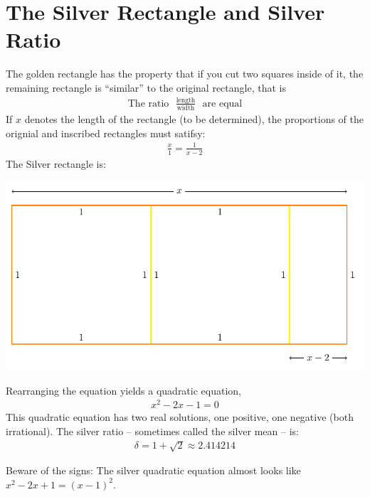 \documentclass[12pt]{article}
\begin{document}
\section{The Silver Rectangle and Silver Ratio}
The golden rectangle has the property that if you cut two squares inside of it, the remaining rectangle is ``similar'' to the original rectangle, that is 
\begin{align*}
\text{The ratio}~~~ \frac{\text{length}}{\text{width}} ~~~\text{are equal}
\end{align*}
If $x$ denotes the length of the rectangle (to be determined), the proportions of the orignial and inscribed rectangles must satifsy:
\begin{align*}
\frac{x}{1} = \frac{1}{x-2}
\end{align*}
The Silver rectangle is:
\begin{center}
\includegraphics{tikz-rectangle-silver}
\end{center}
Rearranging the equation yields a quadratic equation,
\begin{align*}
x^2 - 2x - 1 = 0
\end{align*}
This quadratic equation has two real solutions, one positive, one negative (both irrational). The silver ratio -- sometimes called the silver mean -- is:
\begin{align*}
\delta = 1+\sqrt{2} \approx 2.414214
\end{align*}

Beware of the signs: The silver quadratic equation almost looks like $x^{2}-2x+1=(x-1)^2$. 
\end{document}
